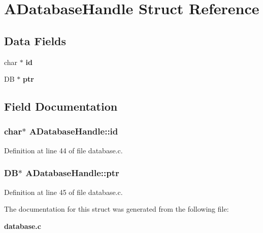\section{ADatabase\-Handle Struct Reference}
\label{structADatabaseHandle}
\subsection*{Data Fields}
\begin{CompactItemize}
\item 
char $\ast$ {\bf id}
\item 
DB $\ast$ {\bf ptr}
\end{CompactItemize}


\subsection{Field Documentation}
\subsubsection{\setlength{\rightskip}{0pt plus 5cm}char$\ast$ {\bf ADatabase\-Handle::id}}\label{structADatabaseHandle_o0}




Definition at line 44 of file database.c.
\subsubsection{\setlength{\rightskip}{0pt plus 5cm}DB$\ast$ {\bf ADatabase\-Handle::ptr}}\label{structADatabaseHandle_o1}




Definition at line 45 of file database.c.

The documentation for this struct was generated from the following file:\begin{CompactItemize}
\item 
{\bf database.c}\end{CompactItemize}
